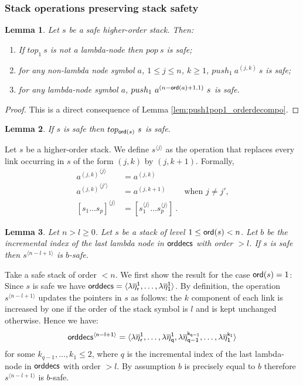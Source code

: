 \documentclass{article}
\newtheorem{lemma}{Lemma}[section]
\theoremstyle{remark}
\theoremstyle{definition}
\newcommand\orddec{\sf orddec}
\begin{document}
\subsubsection{Stack operations preserving stack safety}
\begin{lemma}
\label{lem:push1pop1_preserves_safety} Let $s$ be a safe higher-order
stack. Then:
\begin{enumerate}
  \item If $top_1\ s$ is not a lambda-node then $pop\ s$ is safe;
  \item for any non-lambda node symbol $a$, $1 \leq j \leq n$, $k \geq 1$, $push_1\ a^{(j,k)}\ s$ is safe;
  \item for any lambda-node symbol $a$, $push_1\ a^{(n-{\sf ord}(a)+1,1)}\ s$ is safe.
\end{enumerate}
\end{lemma}
\begin{proof}
This is a direct consequence of Lemma
\ref{lem:push1pop1_orderdecompo}.
\end{proof}


\begin{lemma}
\label{lem:top_qsafe} If $s$ is safe then $top_{{\sf ord}(s)}~s$ is safe.
\end{lemma}


Let $s$ be a higher-order stack. We define $s^{\langle j \rangle}$ as the operation that replaces
every link occurring in $s$ of the form $(j,k)$ by $(j,k+1)$. Formally,
\begin{align*}
{a^{(j,k)}}^{\langle j \rangle} &= a^{(j,k)}   \\
{a^{(j,k)}}^{\langle j' \rangle} &= a^{(j,k+1)} &   \mbox{when $j\neq j'$,}\\
[s_1 \ldots s_p]^{\langle j \rangle} &= [s_1^{\langle j \rangle} \ldots s_p^{\langle j \rangle}] \ .
\end{align*}

\begin{lemma}
\label{lem:incrk_qsafe}
Let $n>l\geq 0$. Let $s$ be a stack of level $1\leq {\sf ord}(s) <n$.
 Let $b$ be the incremental index of the last lambda node in $\orddec{s}$
 with order $>l$.
If $s$ is safe then $s^{\langle n-l+1 \rangle}$ is $b$-safe.
\end{lemma}
\proof Take a safe stack of order $<n$.
 We first show the result for the case ${\sf ord}(s) = 1$:
Since $s$ is safe we have
$\orddec{s} = \langle \lambda \overline{\eta}_r^1
, \ldots, \lambda \overline{\eta}_1^1   \rangle$.
By definition, the operation $s^{\langle n-l+1 \rangle}$ updates the pointers in $s$  as follows:
the $k$ component of each link is increased by one if the order of
the stack symbol is $l$ and is kept unchanged otherwise.
Hence we have:
\begin{equation*}
\orddec{s^{\langle n-l+1 \rangle}} = \langle
\lambda \overline{\eta}_r^1, \ldots,  \lambda \overline{\eta}_{q}^1, \lambda \overline{\eta}_{q-1}^{k_{q-1}}, \ldots,
 \lambda \overline{\eta}_1^{k_1} \rangle
\end{equation*}
for some $k_{q-1}, \ldots , k_1 \leq 2$, where $q$ is the incremental index of the last lambda-node in $\orddec{s}$ with order $>l$. By assumption $b$ is precisely equal to $b$ therefore $s^{\langle n-l+1 \rangle}$ is $b$-safe.
\end{document}
